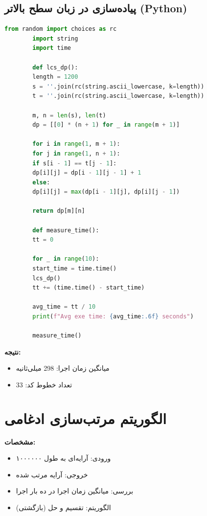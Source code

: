 \documentclass[12pt, a4paper]{report}
\begin{document}
\subsection{پیاده‌سازی در زبان سطح بالاتر (Python)}

\begin{LTR}
	\begin{lstlisting}[language=Python, breaklines=true]
		from random import choices as rc
		import string
		import time
		
		def lcs_dp():
		length = 1200
		s = ''.join(rc(string.ascii_lowercase, k=length))
		t = ''.join(rc(string.ascii_lowercase, k=length))
		
		m, n = len(s), len(t)
		dp = [[0] * (n + 1) for _ in range(m + 1)]
		
		for i in range(1, m + 1):
		for j in range(1, n + 1):
		if s[i - 1] == t[j - 1]:
		dp[i][j] = dp[i - 1][j - 1] + 1
		else:
		dp[i][j] = max(dp[i - 1][j], dp[i][j - 1])
		
		return dp[m][n]
		
		def measure_time():
		tt = 0
		
		for _ in range(10):
		start_time = time.time()
		lcs_dp()
		tt += (time.time() - start_time)
		
		avg_time = tt / 10
		print(f"Avg exe time: {avg_time:.6f} seconds")
		
		measure_time()
	\end{lstlisting}
\end{LTR}

\textbf{نتیجه:}
\begin{itemize}
	\item میانگین زمان اجرا: \textnormal{298} میلی‌ثانیه
	\item تعداد خطوط کد: \textnormal{33}
\end{itemize}


\section{الگوریتم مرتب‌‌سازی ادغامی}

\textbf{مشخصات:}
\begin{itemize}
	\item ورودی: آرایه‌ای به طول ۱۰۰۰۰۰۰
	\item خروجی: آرایه مرتب شده
	\item بررسی: میانگین زمان اجرا در ده بار اجرا
	\item الگوریتم: تقسیم و حل (بازگشتی)
\end{itemize}
\end{document}
